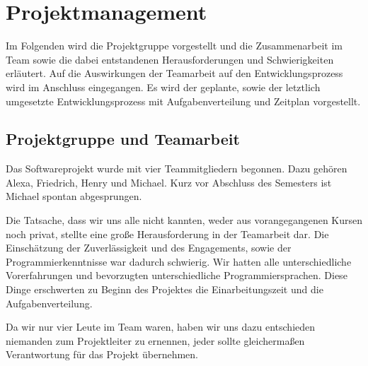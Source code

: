 \section{Projektmanagement}
\label{sec:projektmanagement}

Im Folgenden wird die Projektgruppe vorgestellt und die Zusammenarbeit im Team sowie die dabei entstandenen Herausforderungen und Schwierigkeiten erläutert. Auf die Auswirkungen der Teamarbeit auf den Entwicklungsprozess wird im Anschluss eingegangen. Es wird der geplante, sowie der letztlich umgesetzte Entwicklungsprozess mit Aufgabenverteilung und Zeitplan vorgestellt.

\subsection{Projektgruppe und Teamarbeit}
\label{subsec:teammitglieder}

Das Softwareprojekt wurde mit vier Teammitgliedern begonnen. Dazu gehören Alexa, Friedrich, Henry und Michael. Kurz vor Abschluss des Semesters ist Michael spontan abgesprungen.

Die Tatsache, dass wir uns alle nicht kannten, weder aus vorangegangenen Kursen noch privat, stellte eine große Herausforderung in der Teamarbeit dar. Die Einschätzung der Zuverlässigkeit und des Engagements, sowie der Programmierkenntnisse war dadurch schwierig. Wir hatten alle unterschiedliche Vorerfahrungen und bevorzugten unterschiedliche Programmiersprachen. Diese Dinge erschwerten zu Beginn des Projektes die Einarbeitungszeit und die Aufgabenverteilung.

Da wir nur vier Leute im Team waren, haben wir uns dazu entschieden niemanden zum Projektleiter zu ernennen, jeder sollte gleichermaßen Verantwortung für das Projekt übernehmen.


